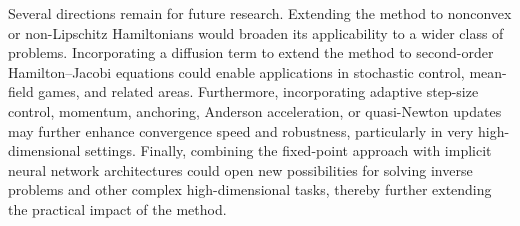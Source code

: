 \documentclass[review,hidelinks,onefignum,onetabnum]{siamart250106}
\begin{document}
Several directions remain for future research. Extending the method to nonconvex or non-Lipschitz Hamiltonians would broaden its applicability to a wider class of problems. Incorporating a diffusion term to extend the method to second-order Hamilton--Jacobi equations could enable applications in stochastic control, mean-field games, and related areas. Furthermore, incorporating adaptive step-size control, momentum, anchoring, Anderson acceleration, or quasi-Newton updates may further enhance convergence speed and robustness, particularly in very high-dimensional settings. Finally, combining the fixed-point approach with implicit neural network architectures \cite{bai2019deep,fung2022jfb} could open new possibilities for solving inverse problems and other complex high-dimensional tasks, thereby further extending the practical impact of the method.




\end{document}
